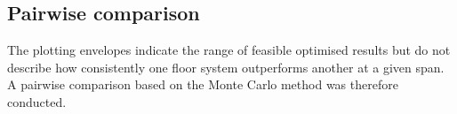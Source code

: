 \newpage
\subsection{Pairwise comparison}

The plotting envelopes indicate the range of feasible optimised results but do not describe how consistently one floor system outperforms another at a given span. A pairwise comparison based on the Monte Carlo method was therefore conducted.


